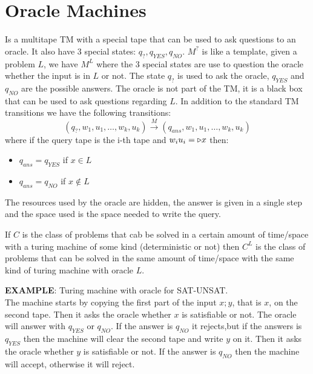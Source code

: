 \newpage
\section{Oracle Machines}
\begin{defbox}
  Is a multitape TM with a special tape that can be used to ask questions to an oracle. It also have 3 special states: $q_?,q_{YES},q_{NO}$. $M^?$ is like a template, given a problem $L$, we have $M^L$ where the 3 special states are use to question the oracle whether the input is in $L$ or not. The state $q_?$ is used to ask the oracle, $q_{YES}$ and $q_{NO}$ are the possible answers. The oracle is not part of the TM, it is a black box that can be used to ask questions regarding $L$. In addition to the standard TM transitions we have the following transitions:
\[
  (q_?, w_1, u_1, \dots, w_k, u_k) \xrightarrow{M} (q_{ans}, w_1, u_1, \dots, w_k, u_k)
\]
where if the query tape is the i-th tape and $w_iu_i=\triangleright x$ then:
\begin{itemize}[label=$\bullet$]
  \item $q_{ans}=q_{YES}$ if $x \in L$
  \item $q_{ans}=q_{NO}$ if $x \notin L$
\end{itemize}
The resources used by the oracle are hidden, the answer is given in a single step and the space used is the space needed to write the query. 
\end{defbox}
\begin{defbox}
  If $C$ is the class of problems that cab be solved in a certain amount of time/space with a turing machine of some kind (deterministic or not) then $C^L$ is the class of problems that can be solved in the same amount of time/space with the same kind of turing machine with oracle $L$.
\end{defbox}
\newpage
\textbf{EXAMPLE}: Turing machine with oracle for \textsc{SAT-UNSAT}.\\
The machine starts by copying the first part of the input $x;y$, that is $x$, on the second tape. Then it asks the oracle whether $x$ is satisfiable or not. The oracle will answer with $q_{YES}$ or $q_{NO}$. If the answer is $q_{NO}$ it rejects,but if the answers is $q_{YES}$ then the machine will clear the second tape and write $y$ on it. Then it asks the oracle whether $y$ is satisfiable or not. If the answer is $q_{NO}$ then the machine will accept, otherwise it will reject. 
